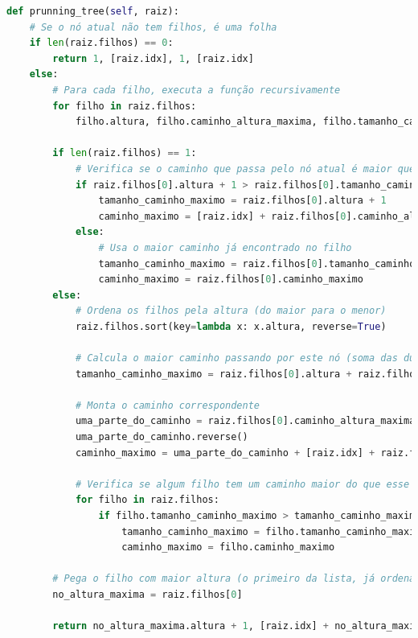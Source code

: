 \begin{lstlisting}[language=Python, caption={IMPLEMENTAÇÃO DO MÉTODO \texttt{prunning\_tree}.}, label={lst:prunning_tree}]
def prunning_tree(self, raiz):
    # Se o nó atual não tem filhos, é uma folha
    if len(raiz.filhos) == 0:
        return 1, [raiz.idx], 1, [raiz.idx]
    else:
        # Para cada filho, executa a função recursivamente
        for filho in raiz.filhos:
            filho.altura, filho.caminho_altura_maxima, filho.tamanho_caminho_maximo, filho.caminho_maximo = self.prunning_tree(filho)

        if len(raiz.filhos) == 1:
            # Verifica se o caminho que passa pelo nó atual é maior que o maior caminho encontrado até o momento
            if raiz.filhos[0].altura + 1 > raiz.filhos[0].tamanho_caminho_maximo:
                tamanho_caminho_maximo = raiz.filhos[0].altura + 1
                caminho_maximo = [raiz.idx] + raiz.filhos[0].caminho_altura_maxima
            else:
                # Usa o maior caminho já encontrado no filho
                tamanho_caminho_maximo = raiz.filhos[0].tamanho_caminho_maximo
                caminho_maximo = raiz.filhos[0].caminho_maximo
        else:
            # Ordena os filhos pela altura (do maior para o menor)
            raiz.filhos.sort(key=lambda x: x.altura, reverse=True)

            # Calcula o maior caminho passando por este nó (soma das duas maiores alturas + o nó atual)
            tamanho_caminho_maximo = raiz.filhos[0].altura + raiz.filhos[1].altura + 1

            # Monta o caminho correspondente
            uma_parte_do_caminho = raiz.filhos[0].caminho_altura_maxima.copy()
            uma_parte_do_caminho.reverse()
            caminho_maximo = uma_parte_do_caminho + [raiz.idx] + raiz.filhos[1].caminho_altura_maxima

            # Verifica se algum filho tem um caminho maior do que esse
            for filho in raiz.filhos:
                if filho.tamanho_caminho_maximo > tamanho_caminho_maximo:
                    tamanho_caminho_maximo = filho.tamanho_caminho_maximo
                    caminho_maximo = filho.caminho_maximo

        # Pega o filho com maior altura (o primeiro da lista, já ordenada)
        no_altura_maxima = raiz.filhos[0]

        return no_altura_maxima.altura + 1, [raiz.idx] + no_altura_maxima.caminho_altura_maxima, tamanho_caminho_maximo, caminho_maximo
\end{lstlisting}

